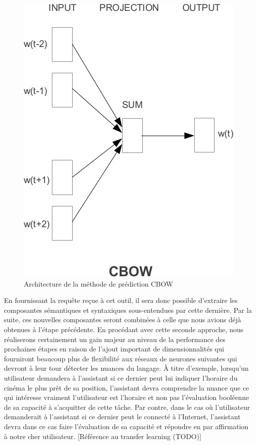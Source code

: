 \documentclass[11pt]{article}
\begin{document}
\begin{figure}[ht]
  \centering
  \includegraphics[width=\columnwidth]{cbow}
  \caption{Architecture de la méthode de prédiction CBOW}
  \label{fig:cbow}
\end{figure}

En fournissant la requête reçue à cet outil, il sera donc possible d'extraire les composantes sémantiques et syntaxiques sous-entendues par cette dernière. Par la suite, ces nouvelles composantes seront combinées à celle que nous avions déjà obtenues à l'étape précédente. En procédant avec cette seconde approche, nous réaliserons certainement un gain majeur au niveau de la performance des prochaines étapes en raison de l'ajout important de dimensionnalités qui fourniront beaucoup plus de flexibilité aux réseaux de neurones suivantes qui devront à leur tour détecter les nuances du langage. À titre d'exemple, lorsqu'un utilisateur demandera à l'assistant si ce dernier peut lui indiquer l'horaire du cinéma le plus prêt de sa position, l'assistant devra comprendre la nuance que ce qui intéresse vraiment l'utilisateur est l'horaire et non pas l'évaluation booléenne de sa capacité à s'acquitter de cette tâche. Par contre, dans le cas où l'utilisateur demanderait à l'assistant si ce dernier peut le connecté à l'Internet, l'assistant devra dans ce cas faire l'évaluation de sa capacité et répondre en par affirmation à notre cher utilisateur. [Référence au transfer learning (TODO)] \\
\end{document}
